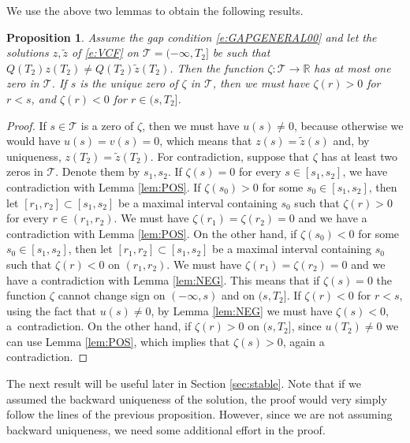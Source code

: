 \documentclass[a4paper,11pt,reqno]{amsart}
\theoremstyle{plain}
\newtheorem{prop}[lem]{Proposition}
\theoremstyle{definition}
\numberwithin{equation}{section}
\newcommand{\R}{\mathbb{R}}
\newcommand{\calt}{\mathcal T}
\begin{document}
 We use the above two lemmas to obtain the following results.
\begin{prop}\label{prop:zeta}
	Assume the gap condition \eqref{e:GAPGENERAL00} and let the solutions $z, \tilde{z}$ of \eqref{e:VCF} on  $\calt=(-\infty,T_2]$  be such that 
 $Q(T_2)z(T_2)\neq Q(T_2)\tilde z(T_2)$.
    Then the function $\zeta\colon\calt\to \R$ has at most one zero in $\calt$. If $s$ is the unique zero of $\zeta$ in $\calt$, then we must have $\zeta(r)>0$ for $r<s$, and $\zeta(r)<0$ for $r\in (s,T_2]$.
\end{prop}

\begin{proof}
	If $s\in \calt$ is a zero of $\zeta$, then we must have $u(s)\neq 0$, because otherwise we would have $u(s) = v(s) = 0$, which means that $z(s) = \tilde z(s)$ and, by uniqueness, $z(T_2) = \tilde z(T_2)$. For contradiction, suppose that $\zeta$ has at least two zeros in $\calt$. Denote them by $s_1, s_2$. If $\zeta(s) = 0$ for every $s\in [s_1, s_2]$, we have contradiction with Lemma \ref{lem:POS}. 
	If $\zeta(s_0)>0$ for some $s_0\in [s_1,s_2]$, then let $[r_1,r_2]\subset [s_1,s_2]$ be a maximal interval containing $s_0$ such that $\zeta(r)>0$ for every $r\in (r_1,r_2)$. We must have $\zeta(r_1) = \zeta(r_2)=0$ and we have a contradiction with Lemma \ref{lem:POS}. On the other hand,  if 	$\zeta(s_0)<0$ for some $s_0\in [s_1,s_2]$, then let $[r_1,r_2]\subset [s_1,s_2]$ be a maximal interval containing $s_0$ such that $\zeta(r)<0$ on $(r_1,r_2)$. We must have $\zeta(r_1)=\zeta(r_2) = 0$ and we have a contradiction with Lemma \ref{lem:NEG}. This means that if $\zeta(s) = 0$ the function $\zeta$ cannot change sign on $(-\infty,s)$ and on $(s,T_2]$.  If $\zeta(r)<0$ for $r<s$, using the fact that $u(s)\neq 0$,  by Lemma \ref{lem:NEG} we must have $\zeta(s)<0$, a~contradiction. On the other hand, if $\zeta(r)>0$ on $(s,T_2]$, since $u(T_2)\neq 0$ we can use Lemma \ref{lem:POS}, which implies that $\zeta(s)>0$, again a contradiction. 
\end{proof}
The next result will be useful later in Section \ref{sec:stable}. Note that if we assumed the backward uniqueness of the solution, the proof would very simply follow the lines of the previous proposition. However, since we are not assuming backward uniqueness, we need some additional effort in the proof.  
\end{document}

